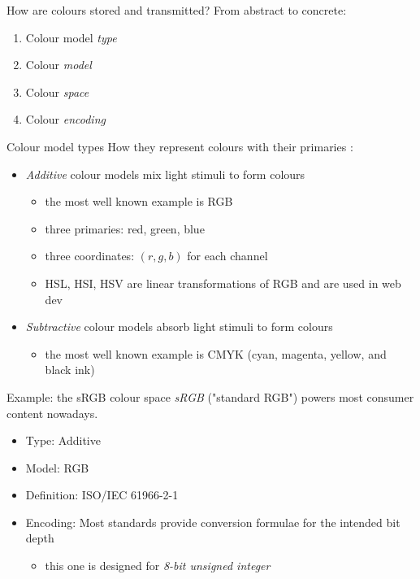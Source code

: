 \documentclass[aspectratio=169,handout,usepdftitle=false]{fireshonks}
\begin{document}
\begin{frame}{How are colours stored and transmitted?}
    From abstract to concrete:
    \begin{enumerate}
        \item Colour model \emph{type}
        \item Colour \emph{model}
        \item Colour \emph{space}
        \item Colour \emph{encoding}
    \end{enumerate}
\end{frame}
\begin{frame}{Colour model types}
    How they represent colours with their primaries \autocite{allen23}:
    \begin{itemize}
        \item \emph{Additive} colour models mix light stimuli to form colours
              \begin{itemize}
                  \item the most well known example is RGB
                  \item three primaries: red, green, blue
                  \item three coordinates: $(r, g, b)$ for each channel
                  \item HSL, HSI, HSV are linear transformations of RGB and are used in web dev
              \end{itemize}
        \item \emph{Subtractive} colour models absorb light stimuli to form colours
              \begin{itemize}
                  \item the most well known example is CMYK (cyan, magenta, yellow, and black ink)
              \end{itemize}
    \end{itemize}
\end{frame}
\begin{frame}{Example: the sRGB colour space}
    \emph{sRGB} ("standard RGB") powers most consumer content nowadays.
    \begin{itemize}
        \item Type: Additive
        \item Model: RGB
        \item Definition: ISO/IEC 61966-2-1 \parencite*{srgb2002}
        \item Encoding: Most standards provide conversion formulae for the intended bit depth
              \begin{itemize}
                  \item this one is designed for \emph{8-bit unsigned integer}
              \end{itemize}
    \end{itemize}
\end{frame}
\end{document}
